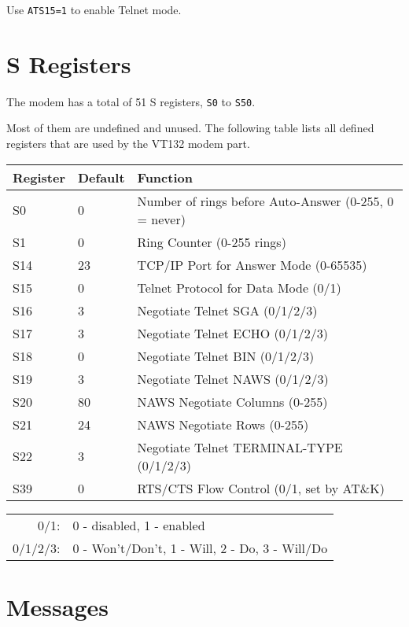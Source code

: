 Use \texttt{ATS15=1} to enable Telnet mode.

\newpage
\section{S Registers}
\label{sregister}

The modem has a total of 51 S registers, \texttt{S0} to \texttt{S50}.

Most of them are undefined and unused. The following table lists all defined registers that are used by the VT132 modem part.

\begin{tabulary}{\textwidth}{L | L | L}
\hline
\mbox{\textbf{Register}} & \mbox{\textbf{Default}} & \textbf{Function} \\
\hline
S0	& 0		& Number of rings before Auto-Answer \newline (0-255, 0 = never) \\
S1	& 0		& Ring Counter (0-255 rings) \\
S14	& 23	& TCP/IP Port for Answer Mode (0-65535) \\
S15	& 0		& Telnet Protocol for Data Mode (0/1) \\
S16	& 3		& Negotiate Telnet SGA (0/1/2/3) \\
S17	& 3		& Negotiate Telnet ECHO (0/1/2/3) \\
S18	& 0		& Negotiate Telnet BIN (0/1/2/3) \\
S19	& 3		& Negotiate Telnet NAWS (0/1/2/3) \\
S20	& 80	& NAWS Negotiate Columns (0-255) \\
S21	& 24	& NAWS Negotiate Rows (0-255) \\
S22	& 3		& Negotiate Telnet TERMINAL-TYPE (0/1/2/3) \\
S39	& 0		& RTS/CTS Flow Control (0/1, set by AT\&K) \\
\hline
\end{tabulary}

\bigskip
\begin{tabular}{rl}
0/1:		& 0 - disabled, 1 - enabled \\
0/1/2/3:	& 0 - Won't/Don't, 1 - Will, 2 - Do, 3 - Will/Do \\
\end{tabular}


\newpage
\section{Messages}

